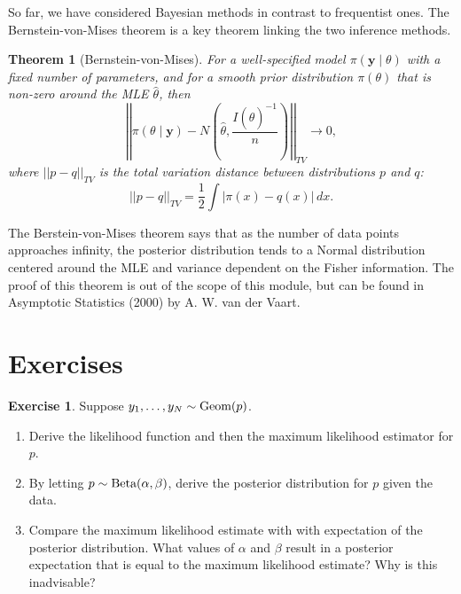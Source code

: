 \documentclass[
]{book}
\providecommand{\tightlist}{%
  \setlength{\itemsep}{0pt}\setlength{\parskip}{0pt}}
\newtheorem{theorem}{Theorem}[chapter]
\theoremstyle{definition}
\theoremstyle{definition}
\theoremstyle{definition}
\newtheorem{exercise}{Exercise}[chapter]
\theoremstyle{definition}
\theoremstyle{remark}
\begin{document}
So far, we have considered Bayesian methods in contrast to frequentist ones. The Bernstein-von-Mises theorem is a key theorem linking the two inference methods.

\begin{theorem}[Bernstein-von-Mises]
For a well-specified model \(\pi(\boldsymbol{y} \mid \theta)\) with a fixed number of parameters, and for a smooth prior distribution \(\pi(\theta)\) that is non-zero around the MLE \(\hat{\theta}\), then
\[
\left|\left| \pi(\theta \mid \boldsymbol{y}) - N\left(\hat{\theta}, \frac{I(\hat{\theta})^{-1}}{n}\right) \right|\right|_{TV} \rightarrow 0,
\]
where \(||p - q||_{TV}\) is the total variation distance between distributions \(p\) and \(q\):
\[
||p - q||_{TV} = \frac{1}{2}\int|\pi(x) - q(x)|\,dx.
\]
\end{theorem}

The Berstein-von-Mises theorem says that as the number of data points approaches infinity, the posterior distribution tends to a Normal distribution centered around the MLE and variance dependent on the Fisher information. The proof of this theorem is out of the scope of this module, but can be found in Asymptotic Statistics (2000) by A. W. van der Vaart.

\hypertarget{exercises-1}{%
\section{Exercises}\label{exercises-1}}

\begin{exercise}

Suppose \(y_1, \ldots, y_N \sim \hbox{Geom}(p)\).

\begin{enumerate}
\def\labelenumi{\arabic{enumi}.}
\tightlist
\item
  Derive the likelihood function and then the maximum likelihood estimator for \(p\).
\item
  By letting \(p \sim \hbox{Beta}(\alpha, \beta)\), derive the posterior distribution for \(p\) given the data.
\item
  Compare the maximum likelihood estimate with with expectation of the posterior distribution. What values of \(\alpha\) and \(\beta\) result in a posterior expectation that is equal to the maximum likelihood estimate? Why is this inadvisable?
\end{enumerate}

\end{exercise}
\end{document}
